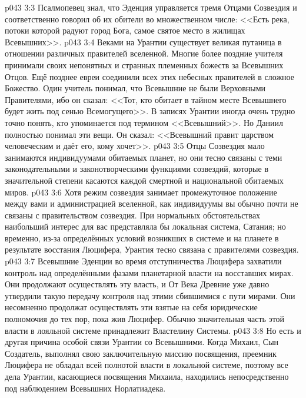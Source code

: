 \vs p043 3:3 Псалмопевец знал, что Эденция управляется тремя Отцами Созвездия и соответственно говорил об их обители во множественном числе: <<Есть река, потоки которой радуют город Бога, самое святое место в жилищах Всевышних>>.
\vs p043 3:4 \pc Веками на Урантии существует великая путаница в отношении различных правителей вселенной. Многие более поздние учителя принимали своих непонятных и странных племенных божеств за Всевышних Отцов. Ещё позднее евреи соединили всех этих небесных правителей в сложное Божество. Один учитель понимал, что Всевышние не были Верховными Правителями, ибо он сказал: <<Тот, кто обитает в тайном месте Всевышнего будет жить под сенью Всемогущего>>. В записях Урантии иногда очень трудно точно понять, кто упоминается под термином <<Всевышний>>. Но Даниил полностью понимал эти вещи. Он сказал: <<Всевышний правит царством человеческим и даёт его, кому хочет>>.
\vs p043 3:5 \pc Отцы Созвездия мало занимаются индивидуумами обитаемых планет, но они тесно связаны с теми законодательными и законотворческими функциями созвездий, которые в значительной степени касаются каждой смертной  и национальной  обитаемых миров.
\vs p043 3:6 Хотя режим созвездия занимает промежуточное положение между вами и администрацией вселенной, как индивидуумы вы обычно почти не связаны с правительством созвездия. При нормальных обстоятельствах наибольший интерес для вас представляла бы локальная система, Сатания; но временно, из-за определённых условий возникших в системе и на планете в результате восстания Люцифера, Урантия тесно связана с правителями созвездия.
\vs p043 3:7 Всевышние Эденции во время отступничества Люцифера захватили контроль над определёнными фазами планетарной власти на восставших мирах. Они продолжают осуществлять эту власть, и От Века Древние уже давно утвердили такую передачу контроля над этими сбившимися с пути мирами. Они несомненно продолжат осуществлять эти взятые на себя юридические полномочия до тех пор, пока жив Люцифер. Обычно значительная часть этой власти в лояльной системе принадлежит Властелину Системы.
\vs p043 3:8 Но есть и другая причина особой связи Урантии со Всевышними. Когда Михаил, Сын Создатель, выполнял свою заключительную миссию посвящения, преемник Люцифера не обладал всей полнотой власти в локальной системе, поэтому все дела Урантии, касающиеся посвящения Михаила, находились непосредственно под наблюдением Всевышних Норлатиадека.
